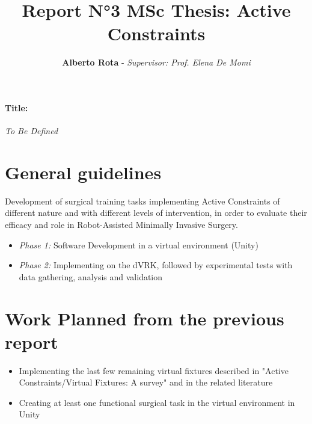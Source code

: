 \documentclass{article}
\title{\textbf{Report N°3 MSc Thesis: Active Constraints}}
\author{\textbf{Alberto Rota} - \textit{Supervisor: Prof. Elena De Momi}}
\date{}
\begin{document}
\maketitle
\paragraph{Title:} \textit{To Be Defined}
\section*{General guidelines}
    Development of surgical training tasks implementing Active Constraints of
    different nature and with different levels of intervention, in order to
    evaluate their efficacy and role in Robot-Assisted Minimally Invasive
    Surgery.
    \begin{itemize}
        \item \textit{Phase 1: }Software Development in a virtual environment
        (Unity)
        \item \textit{Phase 2: }Implementing on the dVRK, followed by experimental tests with data gathering, analysis and validation
    \end{itemize}
\section*{Work Planned from the previous report}
    \begin{itemize}
        \item Implementing the last few remaining virtual fixtures described in
        "Active Constraints/Virtual Fixtures: A survey" and in the related
        literature
        \item Creating at least one functional surgical task in the virtual
        environment in Unity
    \end{itemize}
\end{document}

